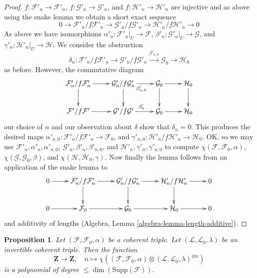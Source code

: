 \documentclass{stacks-project}
\theoremstyle{plain}
\newtheorem{proposition}[subsection]{Proposition}
\theoremstyle{definition}
\theoremstyle{remark}
\numberwithin{equation}{subsection}
\begin{document}
\begin{proof}
$f : \mathcal{F}'_n \to \mathcal{F}'_n$,
$f : \mathcal{G}'_n \to \mathcal{G}'_n$, and
$f : \mathcal{H}'_n \to \mathcal{H}'_n$ are injective
and as above using the snake lemma we obtain a short exact
sequence
$$
0 \to \mathcal{F}'_n/f\mathcal{F}'_n \to
\mathcal{G}'_n/f\mathcal{G}'_n \to
\mathcal{H}'_n/f\mathcal{H}'_n \to 0
$$
As above we have isomorphisms
$\alpha'_n : \mathcal{F}'_n|_U \to \mathcal{F}$,
$\beta'_n : \mathcal{G}'_n|_U \to \mathcal{G}$, and
$\gamma'_n : \mathcal{H}'_n|_U \to \mathcal{H}$.
We consider the obstruction
$$
\delta_n :
\mathcal{F}'_n/f\mathcal{F}'_n \to
\mathcal{G}'_n/f\mathcal{G}'_n
\xrightarrow{\beta'_{n, 0}}
\mathcal{G}_0 \to
\mathcal{H}_0
$$
as before. However, the commutative diagram
$$
\xymatrix{
\mathcal{F}'_n/f\mathcal{F}'_n \ar[r] \ar[d] &
\mathcal{G}'_n/f\mathcal{G}'_n \ar[r]_{\beta'_{n, 0}} \ar[d] &
\mathcal{G}_0 \ar[r] \ar[d] &
\mathcal{H}_0 \ar[d] \\
\mathcal{F}'/f\mathcal{F}' \ar[r] &
\mathcal{G}'/f\mathcal{G}' \ar[r]^{\beta'_0} &
\mathcal{G}_0 \ar[r] &
\mathcal{H}_0
}
$$
our choice of $n$ and our observation about $\delta$
show that $\delta_n = 0$.
This produces the desired maps
$\alpha'_{n, 0} : \mathcal{F}'_n/f\mathcal{F}'_n \to \mathcal{F}_0$, and
$\gamma'_{n, 0} : \mathcal{H}'_n/f\mathcal{H}'_n \to \mathcal{H}_0$.
OK, so we may use
$\mathcal{F}'_n, \alpha'_n, \alpha'_{n, 0}$,
$\mathcal{G}'_n, \beta'_n, \beta'_{n, 0}$, and
$\mathcal{H}'_n, \gamma'_n, \gamma'_{n, 0}$
to compute
$\chi(\mathcal{F}, \mathcal{F}_0, \alpha)$,
$\chi(\mathcal{G}, \mathcal{G}_0, \beta)$, and
$\chi(\mathcal{H}, \mathcal{H}_0, \gamma)$.
Now finally the lemma follows from
an application of the snake lemma to
$$
\xymatrix{
0 \ar[r] &
\mathcal{F}'_n/f\mathcal{F}'_n \ar[r] \ar[d] &
\mathcal{G}'_n/f\mathcal{G}'_n \ar[r] \ar[d] &
\mathcal{H}'_n/f\mathcal{H}'_n \ar[r] \ar[d] &
0 \\
0 \ar[r] &
\mathcal{F}_0 \ar[r] &
\mathcal{G}_0 \ar[r] &
\mathcal{H}_0 \ar[r] &
0
}
$$
and additivity of lengths (Algebra, Lemma \ref{algebra-lemma-length-additive}).
\end{proof}

\begin{proposition}
\label{proposition-hilbert-triple}
Let $(\mathcal{F}, \mathcal{F}_0, \alpha)$ be a coherent triple.
Let $(\mathcal{L}, \mathcal{L}_0, \lambda)$ be an invertible coherent
triple. Then the function
$$
\mathbf{Z} \longrightarrow \mathbf{Z},\quad
n \longmapsto
\chi((\mathcal{F}, \mathcal{F}_0, \alpha) \otimes
(\mathcal{L}, \mathcal{L}_0, \lambda)^{\otimes n})
$$
is a polynomial of degree $\leq \dim(\text{Supp}(\mathcal{F}))$.
\end{proposition}
\end{document}
